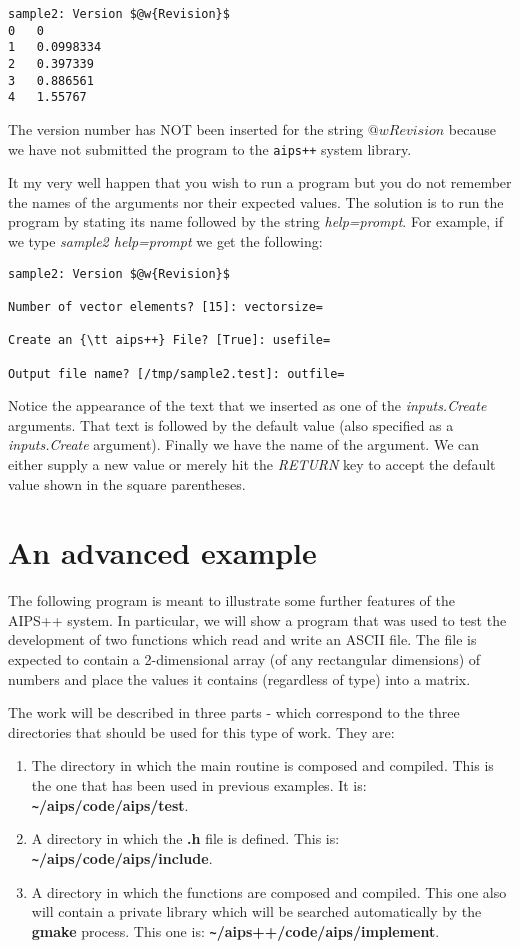 \begin{verbatim}
sample2: Version $@w{Revision}$
0	0
1	0.0998334
2	0.397339
3	0.886561
4	1.55767
\end{verbatim}

The version number has NOT been inserted for the string {\em $@w{Revision}$}
because we have not submitted the program to the {\tt aips++} system library.

It my very well happen that you wish to run a program but you do not
remember the names of the arguments nor their expected values.
The solution is to run the program by stating its name
followed by the string {\em help=prompt}. For example, if we type
{\em sample2 help=prompt} we get the following:

\begin{verbatim}
sample2: Version $@w{Revision}$

Number of vector elements? [15]: vectorsize=

Create an {\tt aips++} File? [True]: usefile=

Output file name? [/tmp/sample2.test]: outfile=
\end{verbatim}

Notice the appearance of the text that we inserted as one of the
{\em inputs.Create} arguments. That text is followed by the default
value (also specified as a {\em inputs.Create} argument). Finally we
have the name of the argument.  We can either supply a new value or
merely hit the {\em RETURN} key to accept the default value shown in the
square parentheses.
\newpage
\section{An advanced example}

	The following program is meant to illustrate some further features of
the AIPS++ system.  In particular, we will show a program that was used to test
the development of two functions which read and write an ASCII file.
The file is expected to contain a 2-dimensional array (of any rectangular 
dimensions) of numbers and place the values it contains (regardless of type) 
into a matrix.

	The work will be described in three parts - which correspond to the
three directories that should be used for this type of work. They are:

\begin{enumerate}
\item The directory in which the main routine is composed and compiled. This is
the one that has been used in previous examples. It is:
{\bf \verb+~+/aips/code/aips/test}.

\item A directory in which the {\bf .h} file is defined. This is:
{\bf \verb+~+/aips/code/aips/include}.

\item A directory in which the functions are composed and compiled. This one also
will contain a private library which will be searched automatically by the
{\bf gmake} process. This one is: {\bf \verb+~+/aips++/code/aips/implement}.
\end{enumerate}

